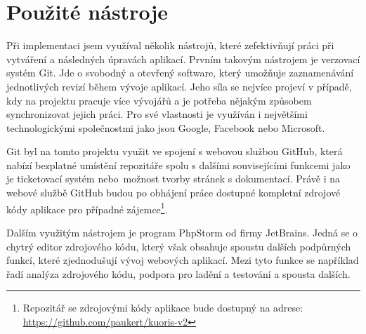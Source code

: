 \section{Použité nástroje}
Při implementaci jsem využíval několik nástrojů, které zefektivňují práci při vytváření a následných úpravách aplikací. Prvním takovým nástrojem je verzovací systém Git. Jde o svobodný a otevřený software, který umožňuje zaznamenávání jednotlivých revizí během vývoje aplikací. Jeho síla se nejvíce projeví v případě, kdy na projektu pracuje více vývojářů a je potřeba nějakým způsobem synchronizovat jejich práci. Pro své vlastnosti je využíván i největšími technologickými společnostmi jako jsou Google, Facebook nebo Microsoft. \cite{git}

Git byl na tomto projektu využit ve spojení s webovou službou GitHub, která nabízí bezplatné umístění repozitáře spolu s dalšími souvisejícími funkcemi jako je ticketovací systém nebo~možnost tvorby  stránek s dokumentací. Právě i na webové službě GitHub budou po obhájení práce dostupné kompletní zdrojové kódy aplikace pro případné zájemce\footnote{Repozitář se zdrojovými kódy aplikace bude dostupný na adrese: \url{https://github.com/paukert/kuoris-v2}}.

Dalším využitým nástrojem je program PhpStorm od firmy JetBrains. Jedná se o chytrý editor zdrojového kódu, který však obsahuje spoustu dalších podpůrných funkcí, které zjednodušují vývoj webových aplikací. Mezi tyto funkce se například řadí analýza zdrojového kódu, podpora pro ladění a testování a spousta dalších.
